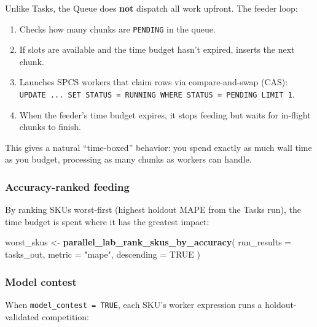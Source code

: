 \documentclass[
]{article}
\newenvironment{Shaded}{\begin{snugshade}}{\end{snugshade}}
\newcommand{\AttributeTok}[1]{\textcolor[rgb]{0.13,0.29,0.53}{#1}}
\newcommand{\ConstantTok}[1]{\textcolor[rgb]{0.56,0.35,0.01}{#1}}
\newcommand{\FunctionTok}[1]{\textcolor[rgb]{0.13,0.29,0.53}{\textbf{#1}}}
\newcommand{\NormalTok}[1]{#1}
\newcommand{\OtherTok}[1]{\textcolor[rgb]{0.56,0.35,0.01}{#1}}
\newcommand{\StringTok}[1]{\textcolor[rgb]{0.31,0.60,0.02}{#1}}
\providecommand{\tightlist}{%
  \setlength{\itemsep}{0pt}\setlength{\parskip}{0pt}}
\begin{document}
Unlike Tasks, the Queue does \textbf{not} dispatch all work upfront. The
feeder loop:

\begin{enumerate}
\def\labelenumi{\arabic{enumi}.}
\tightlist
\item
  Checks how many chunks are \texttt{PENDING} in the queue.
\item
  If slots are available and the time budget hasn't expired, inserts the
  next chunk.
\item
  Launches SPCS workers that claim rows via compare-and-swap (CAS):
  \texttt{UPDATE\ ...\ SET\ STATUS\ =\ \textquotesingle{}RUNNING\textquotesingle{}\ WHERE\ STATUS\ =\ \textquotesingle{}PENDING\textquotesingle{}\ LIMIT\ 1}.
\item
  When the feeder's time budget expires, it stops feeding but waits for
  in-flight chunks to finish.
\end{enumerate}

This gives a natural ``time-boxed'' behavior: you spend exactly as much
wall time as you budget, processing as many chunks as workers can
handle.

\subsubsection{Accuracy-ranked feeding}\label{accuracy-ranked-feeding}

By ranking SKUs worst-first (highest holdout MAPE from the Tasks run),
the time budget is spent where it has the greatest impact:

\begin{Shaded}
\begin{Highlighting}[]
\NormalTok{worst\_skus }\OtherTok{\textless{}{-}} \FunctionTok{parallel\_lab\_rank\_skus\_by\_accuracy}\NormalTok{(}
  \AttributeTok{run\_results =}\NormalTok{ tasks\_out,}
  \AttributeTok{metric      =} \StringTok{"mape"}\NormalTok{,}
  \AttributeTok{descending  =} \ConstantTok{TRUE}
\NormalTok{)}
\end{Highlighting}
\end{Shaded}

\subsubsection{Model contest}\label{model-contest}

When \texttt{model\_contest\ =\ TRUE}, each SKU's worker expression runs
a holdout- validated competition:
\end{document}
